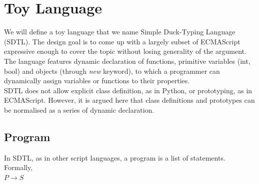 \documentclass[a4paper,12pt]{article}
\begin{document}
\section{Toy Language}
We will define a toy language that we name Simple Duck-Typing Language (SDTL). The design goal is to come up with a largely subset of ECMAScript expressive enough to cover the topic without losing generality of the argument. The language features dynamic declaration of functions, primitive variables (int, bool) and objects (through \textit{new} keyword), to which a programmer can dynamically assign variables or functions to their properties.\\
SDTL does not allow explicit class definition, as in Python, or prototyping, as in ECMAScript. However, it is argued here that class definitions and prototypes can be normalised as a series of dynamic declaration.\\

\subsection{Program}
In SDTL, as in other script languages, a program is a list of statements. Formally,\\
$P \rightarrow S$\\
\end{document}
